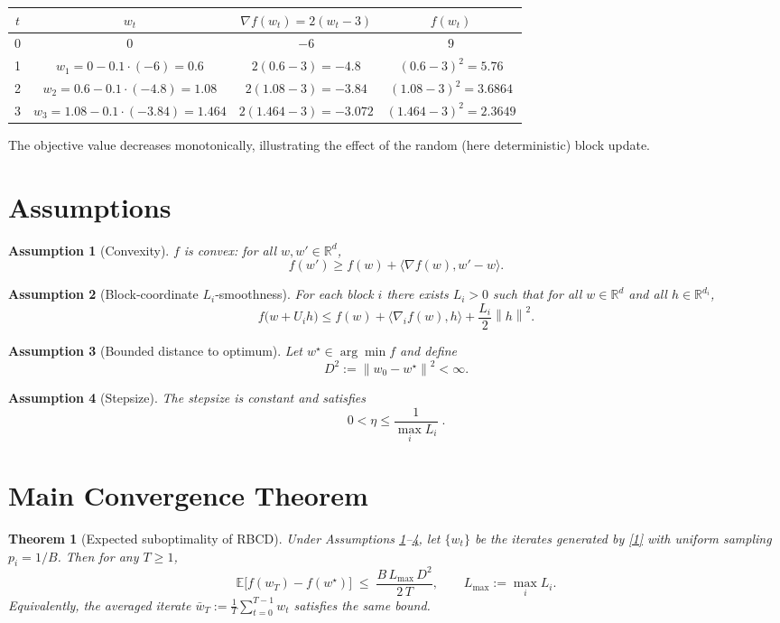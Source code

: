 \documentclass{article}
\newtheorem{theorem}{Theorem}
\newtheorem{assumption}{Assumption}
\newcommand{\EE}{\mathbb{E}}
\newcommand{\RR}{\mathbb{R}}
\newcommand{\norm}[1]{\left\|#1\right\|}
\newcommand{\grad}[1]{\nabla_{#1}}
\begin{document}
\begin{center}
\begin{tabular}{c|c|c|c}
$t$ & $w_t$ & $\nabla f(w_t)=2(w_t-3)$ & $f(w_t)$\\\hline
0 & $0$ & $-6$ & $9$\\
1 & $w_1=0-0.1\cdot(-6)=0.6$ & $2(0.6-3)=-4.8$ & $(0.6-3)^2=5.76$\\
2 & $w_2=0.6-0.1\cdot(-4.8)=1.08$ & $2(1.08-3)=-3.84$ & $(1.08-3)^2=3.6864$\\
3 & $w_3=1.08-0.1\cdot(-3.84)=1.464$ & $2(1.464-3)=-3.072$ & $(1.464-3)^2=2.3649$
\end{tabular}
\end{center}
The objective value decreases monotonically, illustrating the effect of the
random (here deterministic) block update.

\newpage

\section*{Assumptions}
\begin{assumption}[Convexity]\label{ass:convex}
$f$ is convex: for all $w,w'\in\RR^{d}$,
\[
f(w')\ge f(w)+\langle\nabla f(w),w'-w\rangle .
\]
\end{assumption}
\begin{assumption}[Block‑coordinate $L_i$‑smoothness]\label{ass:smooth}
For each block $i$ there exists $L_i>0$ such that for all $w\in\RR^{d}$ and all
$h\in\RR^{d_i}$,
\[
f\bigl(w+U_i h\bigr)\le f(w)+\langle\grad{i}f(w),h\rangle
          +\frac{L_i}{2}\norm{h}^{2}.
\]
\end{assumption}
\begin{assumption}[Bounded distance to optimum]\label{ass:bounded}
Let $w^{\star}\in\arg\min f$ and define
\[
D^{2}:=\norm{w_0-w^{\star}}^{2}<\infty .
\]
\end{assumption}
\begin{assumption}[Stepsize]\label{ass:stepsize}
The stepsize is constant and satisfies
\[
0<\eta\le \frac{1}{\max_{i}L_i}\; .
\]
\end{assumption}

\section*{Main Convergence Theorem}
\begin{theorem}[Expected suboptimality of RBCD]\label{thm:main}
Under Assumptions \ref{ass:convex}–\ref{ass:stepsize}, let $\{w_t\}$ be the
iterates generated by \eqref{1} with uniform sampling
$p_i=1/B$. Then for any $T\ge1$,
\[
\EE\!\bigl[f(w_T)-f(w^{\star})\bigr]
\;\le\;
\frac{B\,L_{\max}\,D^{2}}{2\,T},
\qquad L_{\max}:=\max_{i}L_i .
\]
Equivalently, the averaged iterate $\bar w_T:=\frac1T\sum_{t=0}^{T-1}w_t$
satisfies the same bound.
\end{theorem}
\end{document}
